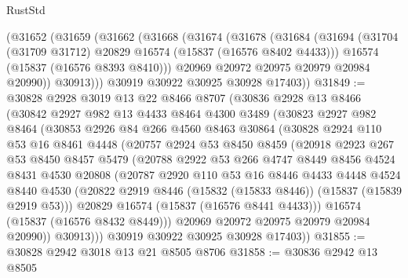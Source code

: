 \begin{lexlean}{RustStd}
\begin{coremodule}
    (@31652
      (@31659
        (@31662
          (@31668
            (@31674
              (@31678
                (@31684
                  (@31694
                    (@31704 (@31709 @31712) @20829 @16574 (@15837 (@16576 @8402 @4433)))
                    @16574
                    (@15837 (@16576 @8393 @8410)))
                  @20969
                  @20972
                  @20975
                  @20979
                  @20984
                  @20990))
              @30913)))
        @30919
        @30922
        @30925
        @30928
        @17403))
@31849 := @30828
    @2928
    @3019
    @13
    @22
    @8466
    @8707
    (@30836
      @2928
      @13
      @8466
      (@30842
        @2927
        @982
        @13
        @4433
        @8464
        @4300
        @3489
        (@30823
          @2927
          @982
          @8464
          (@30853
            @2926
            @84
            @266
            @4560
            @8463
            @30864
            (@30828
              @2924
              @110
              @53
              @16
              @8461
              @4448
              (@20757
                @2924
                @53
                @8450
                @8459
                (@20918
                  @2923
                  @267
                  @53
                  @8450
                  @8457
                  @5479
                  (@20788
                    @2922
                    @53
                    @266
                    @4747
                    @8449
                    @8456
                    @4524
                    @8431
                    @4530
                    @20808
                    (@20787
                      @2920
                      @110
                      @53
                      @16
                      @8446
                      @4433
                      @4448
                      @4524
                      @8440
                      @4530
                      (@20822 @2919 @8446 (@15832 (@15833 @8446)) (@15837 (@15839 @2919 @53)))
                      @20829
                      @16574
                      (@15837 (@16576 @8441 @4433)))
                    @16574
                    (@15837 (@16576 @8432 @8449)))
                  @20969
                  @20972
                  @20975
                  @20979
                  @20984
                  @20990))
              @30913)))
        @30919
        @30922
        @30925
        @30928
        @17403))
@31855 := @30828 @2942 @3018 @13 @21 @8505 @8706
@31858 := @30836 @2942 @13 @8505

\end{coremodule}
\end{lexlean}
